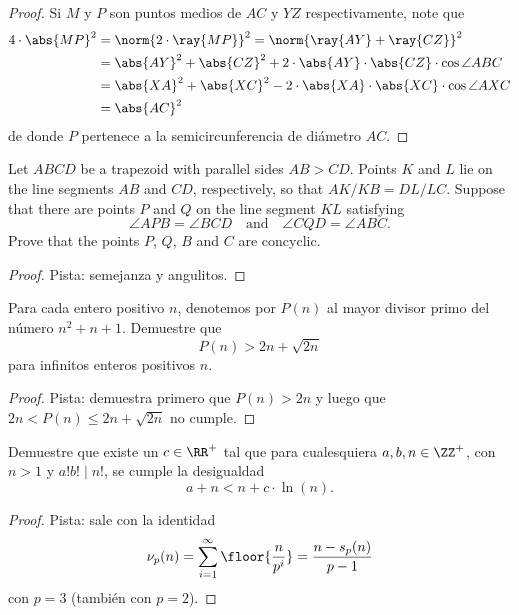 \begin{proof}
  Si $M$ y $P$ son puntos medios de $AC$ y $YZ$ respectivamente, note que
  \begin{align*}
    4\cdot\abs{MP}^2
    &= \norm{2\cdot\ray{MP}}^2=\norm{\ray{AY}+\ray{CZ}}^2 \\
    &= \abs{AY}^2+\abs{CZ}^2+2\cdot\abs{AY}\cdot\abs{CZ}\cdot\cos{\angle ABC} \\
    &= \abs{XA}^2+\abs{XC}^2-2\cdot\abs{XA}\cdot\abs{XC}\cdot\cos{\angle AXC} \\
    &= \abs{AC}^2
  \end{align*}
  de donde $P$ pertenece a la semicircunferencia de diámetro $AC$.
\end{proof}


\begin{probEG}
  Let $ABCD$ be a trapezoid with parallel sides $AB>CD$. Points $K$ and $L$ lie
  on the line segments $AB$ and $CD$, respectively, so that $AK/KB=DL/LC$.
  Suppose that there are points $P$ and $Q$ on the line segment $KL$ satisfying
  \[\angle APB=\angle BCD\quad\text{and}\quad\angle CQD=\angle ABC.\]
  Prove that the points $P$, $Q$, $B$ and $C$ are concyclic.
\end{probEG}

\begin{proof}
  Pista: semejanza y angulitos.
\end{proof}


\begin{probEG}
  Para cada entero positivo $n$, denotemos por $P(n)$ al mayor divisor primo del
  número $n^2+n+1$. Demuestre que
  \[P(n)>2n+\sqrt{2n}\]
  para infinitos enteros positivos $n$.
\end{probEG}

\begin{proof}
  Pista: demuestra primero que $P(n)>2n$ y luego que $2n<P(n)\le 2n+\sqrt{2n}$
  no cumple.
\end{proof}

\begin{probEG}
  Demuestre que existe un $c\in\RR^+$ tal que para cualesquiera $a,b,n\in\ZZ^+$,
  con $n>1$ y $a!b!\mid n!$, se cumple la desigualdad
  \[a+n<n+c\cdot\ln(n).\]
\end{probEG}

\begin{proof}
  Pista: sale con la identidad
  \[\nu_p(n)=\sum_{i=1}^\infty\floor{\frac{n}{p^i}}=\frac{n-s_p(n)}{p-1}\]
  con $p=3$ (también con $p=2$).
\end{proof}

